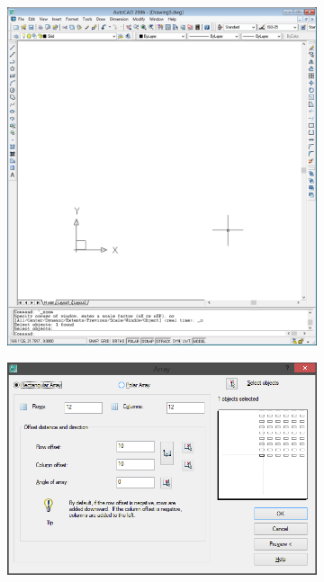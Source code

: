 \documentclass[
	a4paper,
	oneside,
	BCOR = 10mm,
	DIV = 12,
	12pt,
	headings = normal,
]{scrartcl}
\newlength{\gridunitwidth}
\begin{document}
			\begin{figure}[!htbp]
				\begin{subfigure}[b]{4 \gridunitwidth - (2em / 3)}
					\includegraphics[width = \columnwidth]{./assets/p01.png}
					\caption{}
					\label{subfig:01-grid-cell}
				\end{subfigure}%
				\hspace{1em}%
				\begin{subfigure}[b]{4 \gridunitwidth - (2em / 3)}
					\centering
					\includegraphics[width = \columnwidth]{./assets/p02.png}

\end{subfigure}
\end{figure}
\end{document}
